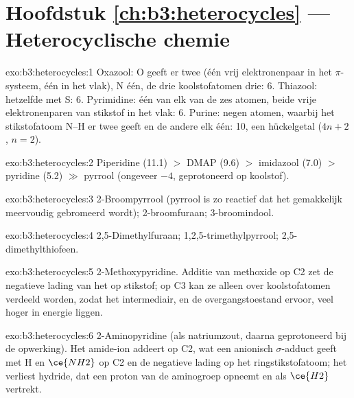 \section*{Hoofdstuk \ref{ch:b3:heterocycles} --- Heterocyclische chemie}

\begin{solution}{exo:b3:heterocycles:1}
Oxazool: O geeft er twee (één vrij elektronenpaar in het $\pi$-systeem, één in het vlak), N één, de
drie koolstofatomen drie: 6. Thiazool: hetzelfde met S: 6. Pyrimidine:
één van elk van de zes atomen, beide vrije elektronenparen van stikstof
in het vlak: 6. Purine: negen atomen, waarbij het stikstofatoom N--H er
twee geeft en de andere elk één: 10, een hückelgetal
($4n + 2$, $n = 2$).
\end{solution}

\begin{solution}{exo:b3:heterocycles:2}
Piperidine (11.1) $>$ DMAP (9.6) $>$ imidazool (7.0) $>$ pyridine (5.2) $\gg$ pyrrool (ongeveer $-4$,
geprotoneerd op koolstof).
\end{solution}

\begin{solution}{exo:b3:heterocycles:3}
2-Broompyrrool (pyrrool is zo reactief dat het gemakkelijk
meervoudig gebromeerd wordt); 2-broomfuraan; 3-broomindool.
\end{solution}

\begin{solution}{exo:b3:heterocycles:4}
2,5-Dimethylfuraan; 1,2,5-trimethylpyrrool; 2,5-dimethylthiofeen.
\end{solution}

\begin{solution}{exo:b3:heterocycles:5}
2-Methoxypyridine. Additie van methoxide op C2 zet de negatieve lading
van het  op stikstof; op C3 kan ze alleen over
koolstofatomen verdeeld worden, zodat het intermediair, en de
overgangstoestand ervoor, veel hoger in energie liggen.
\end{solution}

\begin{solution}{exo:b3:heterocycles:6}
2-Aminopyridine (als natriumzout, daarna geprotoneerd bij de opwerking).
Het amide-ion addeert op C2, wat een anionisch $\sigma$-adduct geeft met H en $\ce{NH2}$ op C2 en de negatieve
lading op het ringstikstofatoom; het verliest hydride, dat een proton
van de aminogroep opneemt en als $\ce{H2}$ vertrekt.
\end{solution}

